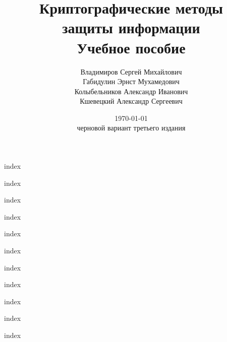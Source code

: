 


\title{Криптографические методы \\ защиты информации \\ \bigskip \normalsize{Учебное пособие}}
\author{Владимиров Сергей Михайлович \\ Габидулин Эрнст Мухамедович \\ Колыбельников Александр Иванович \\ Кшевецкий Александр Сергеевич}
\date{\bigskip \bigskip \bigskip \bigskip \bigskip \today \bigskip \\ \small{черновой вариант третьего издания}}



\maketitle
\setcounter{page}{3}

\newpage
\setcounter{tocdepth}{2}
\tableofcontents
\newpage




{index}



{index}



{index}





{index}

{index}

{index}

{index}

{index}

{index}

{index}


{index}

\printindex

\printusedliterature


